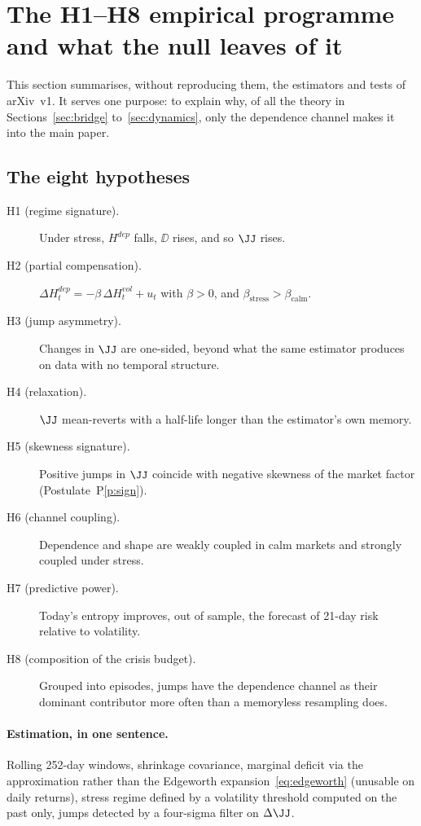 
\section{The H1--H8 empirical programme and what the null leaves of it}
\label{sec:program}

This section summarises, without reproducing them, the estimators and tests of
arXiv~v1. It serves one purpose: to explain why, of all the theory in
Sections~\ref{sec:bridge} to~\ref{sec:dynamics}, only the dependence channel
makes it into the main paper.

\subsection{The eight hypotheses}

\begin{description}
\item[H1 (regime signature).] Under stress, $H^{dep}$ falls, $\DD$ rises, and so
$\JJ$ rises.
\item[H2 (partial compensation).] $\Delta H^{dep}_t=-\beta\,\Delta H^{vol}_t+u_t$
with $\beta>0$, and $\beta_{\text{stress}}>\beta_{\text{calm}}$.
\item[H3 (jump asymmetry).] Changes in $\JJ$ are one-sided, beyond what the same
estimator produces on data with no temporal structure.
\item[H4 (relaxation).] $\JJ$ mean-reverts with a half-life longer than the
estimator's own memory.
\item[H5 (skewness signature).] Positive jumps in $\JJ$ coincide with negative
skewness of the market factor (Postulate~P\ref{p:sign}).
\item[H6 (channel coupling).] Dependence and shape are weakly coupled in calm
markets and strongly coupled under stress.
\item[H7 (predictive power).] Today's entropy improves, out of sample, the
forecast of 21-day risk relative to volatility.
\item[H8 (composition of the crisis budget).] Grouped into episodes, jumps have
the dependence channel as their dominant contributor more often than a
memoryless resampling does.
\end{description}

\paragraph{Estimation, in one sentence.} Rolling 252-day windows,
\citet{ledoit2004} shrinkage covariance, marginal deficit via the
\citet{hyvarinen1998} approximation rather than the Edgeworth
expansion~\eqref{eq:edgeworth} (unusable on daily returns), stress regime
defined by a volatility threshold computed on the past only, jumps detected by a
four-sigma filter on $\Delta\JJ$.

